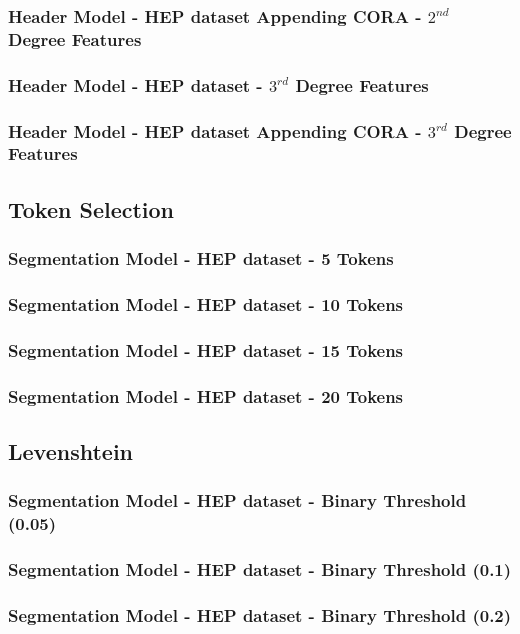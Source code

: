 \documentclass[10pt, oneside]{scrartcl}   	%
\begin{document}
\subsubsection{Header Model - HEP dataset Appending CORA - $2^{nd}$ Degree Features}
\subsubsection{Header Model - HEP dataset - $3^{rd}$ Degree Features}
\subsubsection{Header Model - HEP dataset Appending CORA - $3^{rd}$ Degree Features}
\subsection{Token Selection}
\subsubsection{Segmentation Model - HEP dataset - 5 Tokens}
\subsubsection{Segmentation Model - HEP dataset - 10 Tokens}
\subsubsection{Segmentation Model - HEP dataset - 15 Tokens}
\subsubsection{Segmentation Model - HEP dataset - 20 Tokens}
\subsection{Levenshtein}
\subsubsection{Segmentation Model - HEP dataset - Binary Threshold (0.05)}
\subsubsection{Segmentation Model - HEP dataset - Binary Threshold (0.1)}
\subsubsection{Segmentation Model - HEP dataset - Binary Threshold (0.2)}
\end{document}
